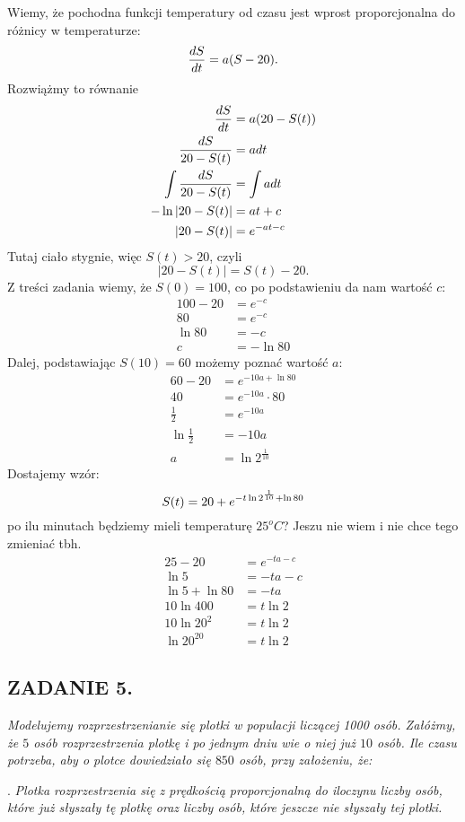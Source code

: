 \documentclass{article}
\begin{document}
Wiemy, że pochodna funkcji temperatury od czasu jest wprost proporcjonalna do różnicy w temperaturze:
$${dS\over dt}=a(S-20).$$
Rozwiążmy to równanie
\begin{align*}
    {dS\over dt}&=a(20-S(t))\\
    {dS\over 20-S(t)}&=adt\\
    \int {dS\over 20-S(t)}&=\int adt\\
    -\ln|20-S(t)|&=at+c\\
    |20-S(t)|&=e^{-at-c}
\end{align*}
Tutaj ciało stygnie, więc $S(t)>20$, czyli
$$|20-S(t)|=S(t)-20.$$
Z treści zadania wiemy, że $S(0)=100$, co po podstawieniu da nam wartość $c$:
\begin{align*}
    100-20&=e^{-c}\\
    80&=e^{-c}\\
    \ln80&=-c\\
    c&=-\ln80
\end{align*}
Dalej, podstawiając $S(10)=60$ możemy poznać wartość $a$:
\begin{align*}
    60-20&=e^{-10a+\ln80}\\
    40&=e^{-10a}\cdot 80\\
    \frac12&=e^{-10a}\\
    \ln\frac12&=-10a\\
    a&=\ln2^{\frac1{10}}
\end{align*}
Dostajemy wzór:
$$S(t)=20+e^{-t\ln2^{1\over10}+\ln80}$$
po ilu minutach będziemy mieli temperaturę $25^oC$? Jeszu nie wiem i nie chce tego zmieniać tbh.
\begin{align*}
    25-20&=e^{-ta-c}\\
    \ln5&=-ta-c\\
    \ln5+\ln80&=-ta\\
    10\ln400&=t\ln2\\
    10\ln20^2&=t\ln2\\
    \ln20^{20}&=t\ln2
\end{align*}

\subsection*{ZADANIE 5.}
\emph{Modelujemy rozprzestrzenianie się plotki w populacji liczącej 1000 osób. Załóżmy, że $5$ osób rozprzestrzenia plotkę i po jednym dniu wie o niej już $10$ osób. Ile czasu potrzeba, aby o plotce dowiedziało się $850$ osób, przy założeniu, że:}

. \emph{Plotka rozprzestrzenia się z prędkością proporcjonalną do iloczynu liczby osób, które już słyszały tę plotkę oraz liczby osób, które jeszcze nie słyszały tej plotki.}
\end{document}
